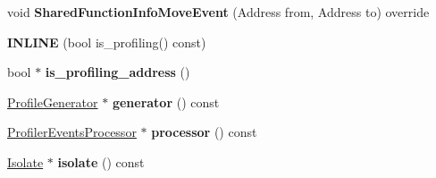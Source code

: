 \begin{DoxyCompactItemize}
\item 
void {\bfseries Shared\+Function\+Info\+Move\+Event} (Address from, Address to) override\hypertarget{classv8_1_1internal_1_1_cpu_profiler_a2ed617b7410ffb6d8556e0cb175bbd35}{}\label{classv8_1_1internal_1_1_cpu_profiler_a2ed617b7410ffb6d8556e0cb175bbd35}

\item 
{\bfseries I\+N\+L\+I\+NE} (bool is\+\_\+profiling() const)\hypertarget{classv8_1_1internal_1_1_cpu_profiler_aa86e82e0bcbbb1b8cc386a539f543493}{}\label{classv8_1_1internal_1_1_cpu_profiler_aa86e82e0bcbbb1b8cc386a539f543493}

\item 
bool $\ast$ {\bfseries is\+\_\+profiling\+\_\+address} ()\hypertarget{classv8_1_1internal_1_1_cpu_profiler_a272a447ab3258f3643aaee44a1990655}{}\label{classv8_1_1internal_1_1_cpu_profiler_a272a447ab3258f3643aaee44a1990655}

\item 
\hyperlink{classv8_1_1internal_1_1_profile_generator}{Profile\+Generator} $\ast$ {\bfseries generator} () const \hypertarget{classv8_1_1internal_1_1_cpu_profiler_a460b95c00fd76f316c9b2bc1b8fbe249}{}\label{classv8_1_1internal_1_1_cpu_profiler_a460b95c00fd76f316c9b2bc1b8fbe249}

\item 
\hyperlink{classv8_1_1internal_1_1_profiler_events_processor}{Profiler\+Events\+Processor} $\ast$ {\bfseries processor} () const \hypertarget{classv8_1_1internal_1_1_cpu_profiler_a9d411d096228db93e7e8c41023f279a4}{}\label{classv8_1_1internal_1_1_cpu_profiler_a9d411d096228db93e7e8c41023f279a4}

\item 
\hyperlink{classv8_1_1internal_1_1_isolate}{Isolate} $\ast$ {\bfseries isolate} () const \hypertarget{classv8_1_1internal_1_1_cpu_profiler_a294dc8fbe0a2d94fe807160acc8dee3d}{}\label{classv8_1_1internal_1_1_cpu_profiler_a294dc8fbe0a2d94fe807160acc8dee3d}

\end{DoxyCompactItemize}
